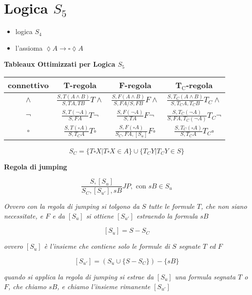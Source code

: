 \documentclass[a4paper,12pt, oneside]{book}
\begin{document}
\section*{Logica $S_5$}
\begin{itemize}
  \item logica $S_4$
  \item l'assioma $\lozenge A\to \square\lozenge A$
\end{itemize}
\begin{center}
  \textbf{Tableaux Ottimizzati per Logica $S_5$}
\end{center}
\begin{table}[H]
  \Large
  \centering
  \begin{tabular}{c||c|c|c}
    connettivo& T-regola& F-regola&T$_{\mbox{C}}$-regola\\
    \hline
    \hline
    $\land$ & $\frac{S,T(A\land B)}{S,TA,TB}T\land$&
                        $\frac{S,F(A\land B)}{S,FA/S,FB}F\land$&
                 $\frac{S,T_C(A\land B)}{S,T_CA,T_CB}T_C\land$\\
    \hline
    $\neg$ & $\frac{S,T(\neg A)}{S,FA}T\neg$&
                        $\frac{S,F(\neg A)}{S,TA}F\neg$&
         $\frac{S,T_C(\neg A)}{S,FA,T_C(\neg A)}T_C\neg$\\
    \hline
    $\square$ & $\frac{S,T(\square A)}{S,T_CA}T\square$&
             $\frac{S,F(\square A)}{S_C,FA,[S_u]}F\square$&
              $\frac{S,T_C(\square A)}{S,T_CA}T_C\square$\\
  \end{tabular}
\end{table}
\[S_C=\{T\square X|T\square X\in A\}\cup\{T_CY|T_CY\in S\}\]
\begin{center}
  \textbf{Regola di jumping}
\end{center}
\[\frac{S,[S_u]}{S_C,[S_{u'}],sB}JP,\mbox{ con }sB\in S_u\]
\begin{center}
  \textit{Ovvero con la regola di jumping si
    tolgono da $S$ tutte le formule $T$, che non siano necessitate, e $F$ e da
    $[S_u]$ si ottiene $[S_{u'}]$ estraendo la formula $sB$}
\end{center}
\[[S_u]=S-S_C\]
\begin{center}
  \textit{ovvero $[S_u]$ è l'insieme che contiene solo le formule di $S$ segnate
    $T$ ed $F$}  
\end{center}
\[[S_{u'}]=(S_u\cup\{S-S_C\})-\{sB\}\]
\begin{center}
  \textit{quando si applica la regola di jumping si estrae da $[S_u]$ una
    formula segnata $T$ o $F$, che chiamo $sB$, e chiamo l'insieme rimanente
    $[S_{u'}]$}
\end{center}
\end{document}
